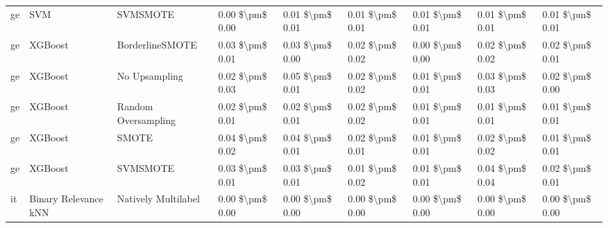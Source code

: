 \begin{tabular}{lllllllll}
      ge &                             SVM &                      SVMSMOTE & 0.00 \$\textbackslash pm\$ 0.00 &           0.01 \$\textbackslash pm\$ 0.01 &       0.01 \$\textbackslash pm\$ 0.01 &        0.01 \$\textbackslash pm\$ 0.01 &                         0.01 \$\textbackslash pm\$ 0.01 &     0.01 \$\textbackslash pm\$ 0.01 \\
      ge &                         XGBoost &               BorderlineSMOTE & 0.03 \$\textbackslash pm\$ 0.01 &           0.03 \$\textbackslash pm\$ 0.00 &       0.02 \$\textbackslash pm\$ 0.02 &        0.00 \$\textbackslash pm\$ 0.00 &                         0.02 \$\textbackslash pm\$ 0.02 &     0.02 \$\textbackslash pm\$ 0.01 \\
      ge &                         XGBoost &                 No Upsampling & 0.02 \$\textbackslash pm\$ 0.03 &           0.05 \$\textbackslash pm\$ 0.01 &       0.02 \$\textbackslash pm\$ 0.02 &        0.01 \$\textbackslash pm\$ 0.01 &                         0.03 \$\textbackslash pm\$ 0.03 &     0.02 \$\textbackslash pm\$ 0.00 \\
      ge &                         XGBoost &           Random Oversampling & 0.02 \$\textbackslash pm\$ 0.01 &           0.02 \$\textbackslash pm\$ 0.01 &       0.02 \$\textbackslash pm\$ 0.02 &        0.01 \$\textbackslash pm\$ 0.01 &                         0.01 \$\textbackslash pm\$ 0.01 &     0.01 \$\textbackslash pm\$ 0.01 \\
      ge &                         XGBoost &                         SMOTE & 0.04 \$\textbackslash pm\$ 0.02 &           0.04 \$\textbackslash pm\$ 0.01 &       0.02 \$\textbackslash pm\$ 0.01 &        0.01 \$\textbackslash pm\$ 0.01 &                         0.02 \$\textbackslash pm\$ 0.02 &     0.01 \$\textbackslash pm\$ 0.01 \\
      ge &                         XGBoost &                      SVMSMOTE & 0.03 \$\textbackslash pm\$ 0.01 &           0.03 \$\textbackslash pm\$ 0.01 &       0.01 \$\textbackslash pm\$ 0.02 &        0.01 \$\textbackslash pm\$ 0.01 &                         0.04 \$\textbackslash pm\$ 0.04 &     0.02 \$\textbackslash pm\$ 0.01 \\
      it &            Binary Relevance kNN &           Natively Multilabel & 0.00 \$\textbackslash pm\$ 0.00 &           0.00 \$\textbackslash pm\$ 0.00 &       0.00 \$\textbackslash pm\$ 0.00 &        0.00 \$\textbackslash pm\$ 0.00 &                         0.00 \$\textbackslash pm\$ 0.00 &     0.00 \$\textbackslash pm\$ 0.00 \\

\end{tabular}
